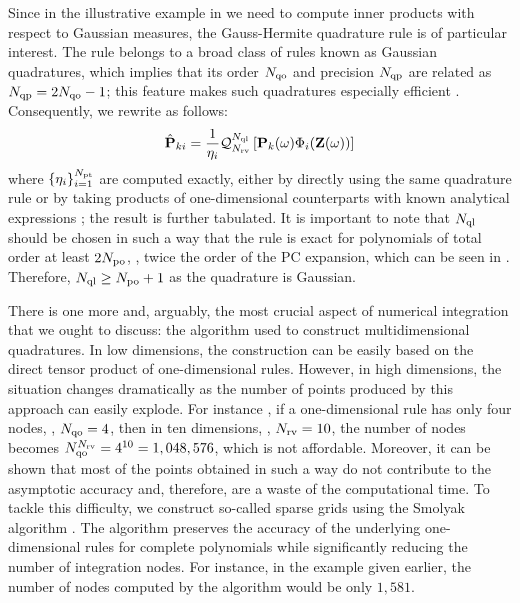 Since in the illustrative example in  we need to compute inner products with respect to Gaussian measures, the Gauss-Hermite quadrature rule is of particular interest. The rule belongs to a broad class of rules known as Gaussian quadratures, which implies that its order $N_\text{qo}$ and precision $N_\text{qp}$ are related as $N_\text{qp} = 2 N_\text{qo} - 1$; this feature makes such quadratures especially efficient \cite{heiss2008}. Consequently, we rewrite  as follows:
\[
  \hat{\mathbf{P}}_{ki} = \frac{1}{\eta_i} \mathcal{Q}_{{N_\text{rv}}}^{N_\text{ql}}\left[\mathbf{P}_k(\omega) \Phi_i(\mathbf{Z}(\omega))\right]
\]
where $\{ \eta_i \}_{i = 1}^{{N_\text{pt}}}$ are computed exactly, either by directly using the same quadrature rule or by taking products of one-dimensional counterparts with known analytical expressions \cite{xiu2010}; the result is further tabulated. It is important to note that $N_\text{ql}$ should be chosen in such a way that the rule is exact for polynomials of total order at least $2 {N_\text{po}}$, \ie, twice the order of the PC expansion, which can be seen in  \cite{eldred2009}. Therefore, $N_\text{ql} \geq {N_\text{po}} + 1$ as the quadrature is Gaussian.

There is one more and, arguably, the most crucial aspect of numerical integration that we ought to discuss: the algorithm used to construct multidimensional quadratures. In low dimensions, the construction can be easily based on the direct tensor product of one-dimensional rules. However, in high dimensions, the situation changes dramatically as the number of points produced by this approach can easily explode. For instance \cite{heiss2008}, if a one-dimensional rule has only four nodes, \ie, $N_\text{qo} = 4$, then in ten dimensions, \ie, ${N_\text{rv}} = 10$, the number of nodes becomes $N_\text{qo}^{{N_\text{rv}}} = 4^{10} = 1,048,576$, which is not affordable. Moreover, it can be shown that most of the points obtained in such a way do not contribute to the asymptotic accuracy and, therefore, are a waste of the computational time. To tackle this difficulty, we construct so-called sparse grids using the Smolyak algorithm \cite{eldred2009, maitre2010, heiss2008}. The algorithm preserves the accuracy of the underlying one-dimensional rules for complete polynomials while significantly reducing the number of integration nodes. For instance, in the example given earlier, the number of nodes computed by the algorithm would be only $1,581$.
